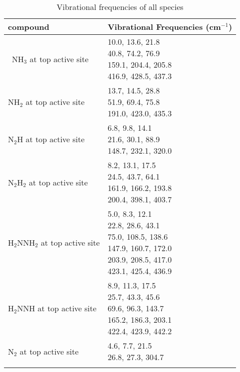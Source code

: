 \clearpage
\begin{center}
\renewcommand*{\arraystretch}{2}
\begin{longtable}{|m{6cm} |m{6cm} |} 
\caption{Vibrational frequencies of all species}
\label{tab:energies}
\endfirsthead
\endhead
\hline
compound & Vibrational Frequencies (cm$^{-1}$) \\ \hline\ 
NH$_{3}$ at top active site&\parbox[t]{6cm}{10.0, 13.6, 21.8\\40.8, 74.2, 76.9\\159.1, 204.4, 205.8\\416.9, 428.5, 437.3}\\ \hline \n NH$_{2}$ at top active site&\parbox[t]{6cm}{13.7, 14.5, 28.8\\51.9, 69.4, 75.8\\191.0, 423.0, 435.3}\\ \hline \n N$_{2}$H at top active site&\parbox[t]{6cm}{6.8, 9.8, 14.1\\21.6, 30.1, 88.9\\148.7, 232.1, 320.0}\\ \hline \n N$_{2}$H$_{2}$ at top active site&\parbox[t]{6cm}{8.2, 13.1, 17.5\\24.5, 43.7, 64.1\\161.9, 166.2, 193.8\\200.4, 398.1, 403.7}\\ \hline \n H$_{2}$NNH$_{2}$ at top active site&\parbox[t]{6cm}{5.0, 8.3, 12.1\\22.8, 28.6, 43.1\\75.0, 108.5, 138.6\\147.9, 160.7, 172.0\\203.9, 208.5, 417.0\\423.1, 425.4, 436.9}\\ \hline \n H$_{2}$NNH at top active site&\parbox[t]{6cm}{8.9, 11.3, 17.5\\25.7, 43.3, 45.6\\69.6, 96.3, 143.7\\165.2, 186.3, 203.1\\422.4, 423.9, 442.2}\\ \hline \n N$_{2}$ at top active site&\parbox[t]{6cm}{4.6, 7.7, 21.5\\26.8, 27.3, 304.7}\\ \hline \n  \end{longtable}
\end{center}
